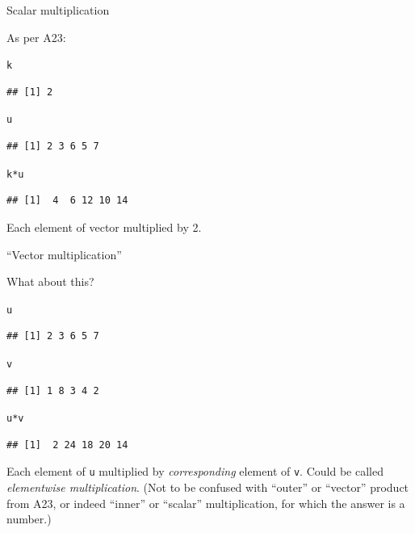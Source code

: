 \documentclass[unknownkeysallowed]{beamer}\usepackage[]{graphicx}\usepackage[]{color}
\makeatletter
\newcommand{\hlopt}[1]{\textcolor[rgb]{0,0,0}{#1}}%
\newcommand{\hlstd}[1]{\textcolor[rgb]{0.345,0.345,0.345}{#1}}%
\newenvironment{kframe}{%
 \def\at@end@of@kframe{}%
 \ifinner\ifhmode%
  \def\at@end@of@kframe{\end{minipage}}%
  \begin{minipage}{\columnwidth}%
 \fi\fi%
 \def\FrameCommand##1{\hskip\@totalleftmargin \hskip-\fboxsep
 \colorbox{shadecolor}{##1}\hskip-\fboxsep
     \hskip-\linewidth \hskip-\@totalleftmargin \hskip\columnwidth}%
 \MakeFramed {\advance\hsize-\width
   \@totalleftmargin\z@ \linewidth\hsize
   \@setminipage}}%
 {\par\unskip\endMakeFramed%
 \at@end@of@kframe}
\newenvironment{knitrout}{}{} %
\makeatother
\begin{document}
\begin{frame}[fragile]{Scalar multiplication}

As per A23:

\begin{knitrout}
\color{fgcolor}\begin{kframe}
\begin{alltt}
\hlstd{k}
\end{alltt}
\begin{verbatim}
## [1] 2
\end{verbatim}
\begin{alltt}
\hlstd{u}
\end{alltt}
\begin{verbatim}
## [1] 2 3 6 5 7
\end{verbatim}
\begin{alltt}
\hlstd{k}\hlopt{*}\hlstd{u}
\end{alltt}
\begin{verbatim}
## [1]  4  6 12 10 14
\end{verbatim}
\end{kframe}
\end{knitrout}

Each element of vector multiplied by 2.
  
\end{frame}

\begin{frame}[fragile]{``Vector multiplication''}

What about this?

\begin{knitrout}
\color{fgcolor}\begin{kframe}
\begin{alltt}
\hlstd{u}
\end{alltt}
\begin{verbatim}
## [1] 2 3 6 5 7
\end{verbatim}
\begin{alltt}
\hlstd{v}
\end{alltt}
\begin{verbatim}
## [1] 1 8 3 4 2
\end{verbatim}
\begin{alltt}
\hlstd{u}\hlopt{*}\hlstd{v}
\end{alltt}
\begin{verbatim}
## [1]  2 24 18 20 14
\end{verbatim}
\end{kframe}
\end{knitrout}

Each element of \texttt{u} multiplied by \emph{corresponding} element
of \texttt{v}. Could be called \emph{elementwise multiplication}. (Not
to be confused with ``outer'' or ``vector'' product from A23, or
indeed ``inner'' or ``scalar'' multiplication, for which the answer is
a number.)
  
\end{frame}
\end{document}
